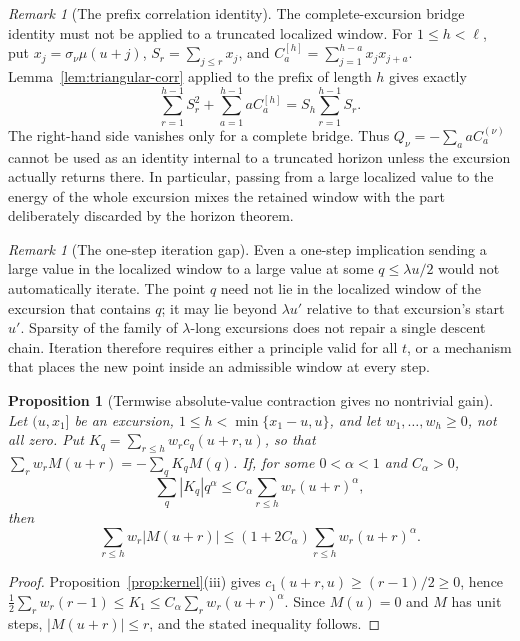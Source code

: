 \documentclass[11pt]{amsart}
\numberwithin{equation}{section}
\theoremstyle{plain}
\newtheorem{proposition}[theorem]{Proposition}
\theoremstyle{definition}
\theoremstyle{remark}
\newtheorem{remark}[theorem]{Remark}
\begin{document}
\begin{remark}[The prefix correlation identity]
\label{rem:prefix-correlation}
The complete-excursion bridge identity must not be applied to a truncated
localized window.  For $1\le h<\ell$, put
$x_j=\sigma_\nu\mu(u+j)$,
$S_r=\sum_{j\le r}x_j$, and
$C_a^{[h]}=\sum_{j=1}^{h-a}x_jx_{j+a}$.  Lemma~\ref{lem:triangular-corr}
applied to the prefix of length $h$ gives exactly
\[
\sum_{r=1}^{h-1}S_r^2+\sum_{a=1}^{h-1}aC_a^{[h]}
=S_h\sum_{r=1}^{h-1}S_r.
\]
The right-hand side vanishes only for a complete bridge.  Thus
$Q_\nu=-\sum_a aC_a^{(\nu)}$ cannot be used as an identity internal to a
truncated horizon unless the excursion actually returns there.  In
particular, passing from a large localized value to the energy of the whole
excursion mixes the retained window with the part deliberately discarded by
the horizon theorem.
\end{remark}

\begin{remark}[The one-step iteration gap]
\label{rem:iteration-gap}
Even a one-step implication sending a large value in the localized window
to a large value at some $q\le\lambda u/2$ would not automatically iterate.
The point $q$ need not lie in the localized window of the excursion that
contains $q$; it may lie beyond $\lambda u'$ relative to that excursion's
start $u'$.  Sparsity of the family of $\lambda$-long excursions does not
repair a single descent chain.  Iteration therefore requires either a
principle valid for all $t$, or a mechanism that places the new point inside
an admissible window at every step.
\end{remark}

\begin{proposition}[Termwise absolute-value contraction gives no nontrivial gain]
\label{prop:cone-obstruction}
Let $(u,x_1]$ be an excursion, $1\le h<\min\{x_1-u,u\}$, and let
$w_1,\dots,w_h\ge0$, not all zero. Put
$K_q=\sum_{r\le h}w_rc_q(u+r,u)$, so that
$\sum_rw_rM(u+r)=-\sum_qK_qM(q)$. If, for some $0<\alpha<1$ and
$C_\alpha>0$,
\[
\sum_q|K_q|q^\alpha\le C_\alpha\sum_{r\le h}w_r(u+r)^\alpha,
\]
then
\[
\sum_{r\le h}w_r|M(u+r)|
\le(1+2C_\alpha)\sum_{r\le h}w_r(u+r)^\alpha.
\]
\end{proposition}

\begin{proof}
Proposition~\ref{prop:kernel}(iii) gives
$c_1(u+r,u)\ge(r-1)/2\ge0$, hence
$\frac12\sum_rw_r(r-1)\le K_1\le
C_\alpha\sum_rw_r(u+r)^\alpha$. Since $M(u)=0$ and $M$ has unit steps,
$|M(u+r)|\le r$, and the stated inequality follows.
\end{proof}
\end{document}
